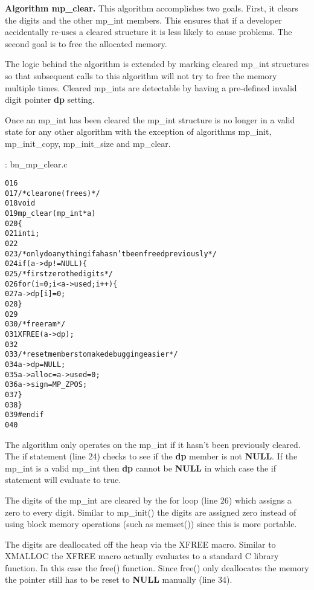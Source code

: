\documentclass[b5paper]{book}
\begin{document}
\textbf{Algorithm mp\_clear.}
This algorithm accomplishes two goals.  First, it clears the digits and the other mp\_int members.  This ensures that 
if a developer accidentally re-uses a cleared structure it is less likely to cause problems.  The second goal
is to free the allocated memory.

The logic behind the algorithm is extended by marking cleared mp\_int structures so that subsequent calls to this
algorithm will not try to free the memory multiple times.  Cleared mp\_ints are detectable by having a pre-defined invalid 
digit pointer \textbf{dp} setting.

Once an mp\_int has been cleared the mp\_int structure is no longer in a valid state for any other algorithm
with the exception of algorithms mp\_init, mp\_init\_copy, mp\_init\_size and mp\_clear.

\vspace{+3mm}\begin{small}
\hspace{-5.1mm}{\bf File}: bn\_mp\_clear.c
\vspace{-3mm}
\begin{alltt}
016   
017   /* clear one (frees)  */
018   void
019   mp_clear (mp_int * a)
020   \{
021     int i;
022   
023     /* only do anything if a hasn't been freed previously */
024     if (a->dp != NULL) \{
025       /* first zero the digits */
026       for (i = 0; i < a->used; i++) \{
027           a->dp[i] = 0;
028       \}
029   
030       /* free ram */
031       XFREE(a->dp);
032   
033       /* reset members to make debugging easier */
034       a->dp    = NULL;
035       a->alloc = a->used = 0;
036       a->sign  = MP_ZPOS;
037     \}
038   \}
039   #endif
040   
\end{alltt}
\end{small}

The algorithm only operates on the mp\_int if it hasn't been previously cleared.  The if statement (line 24)
checks to see if the \textbf{dp} member is not \textbf{NULL}.  If the mp\_int is a valid mp\_int then \textbf{dp} cannot be
\textbf{NULL} in which case the if statement will evaluate to true.

The digits of the mp\_int are cleared by the for loop (line 26) which assigns a zero to every digit.  Similar to mp\_init()
the digits are assigned zero instead of using block memory operations (such as memset()) since this is more portable.  

The digits are deallocated off the heap via the XFREE macro.  Similar to XMALLOC the XFREE macro actually evaluates to
a standard C library function.  In this case the free() function.  Since free() only deallocates the memory the pointer
still has to be reset to \textbf{NULL} manually (line 34).  
\end{document}

